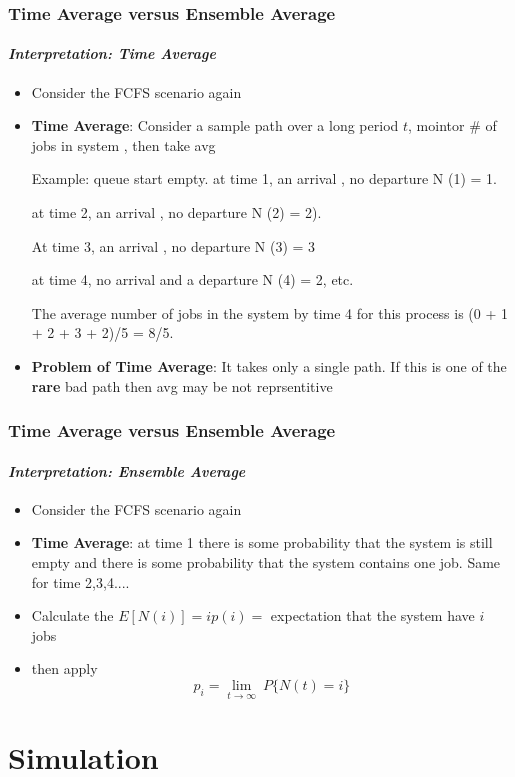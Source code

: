 \documentclass{beamer}
\begin{document}
\begin{frame}
\frametitle{Time Average versus Ensemble Average}
\framesubtitle{\textbf{\textit{Interpretation: Time Average}}}
\begin{itemize}
\item Consider the FCFS scenario again 


\item  \textbf{Time Average}: Consider a sample path over a long period $t$, mointor \# of jobs in system , then take avg

Example: queue  start empty. 
at time 1, an arrival , no departure N (1) = 1. 

at time 2, an arrival , no departure N (2) = 2). 

At time 3, an arrival , no departure N (3) = 3 

at time 4, no arrival and a departure N (4) = 2, etc. 

The average number of jobs in the system by time 4 for this process is (0 + 1 + 2 + 3 + 2)/5 = 8/5.

\item  \textbf{Problem of Time Average}: It takes only a single path. If this is one of the \textbf{rare} bad path then avg may be not reprsentitive


	
\end{itemize}	    
    
\end{frame}

\begin{frame}
\frametitle{Time Average versus Ensemble Average}
\framesubtitle{\textbf{\textit{Interpretation: Ensemble Average}}}
\begin{itemize}
\item Consider the FCFS scenario again 
\item \textbf{Time Average}: at time 1 there is some probability that the system
is still empty and there is some probability that the system contains one job.
Same for time 2,3,4....
\item Calculate the $E [N (i)] = i p(i) =$ expectation that the system have $i$ jobs
\item then apply 
$$p_i = \lim_{t \rightarrow \infty} \: P\{ N(t) = i \}$$

\end{itemize}	    
    
\end{frame}

\section{Simulation}
\end{document}
